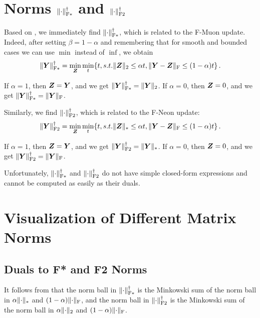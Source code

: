 \documentclass[pmlr]{jmlr}%
\DeclarePairedDelimiter{\normf}{\|}{\|_\mathrm{F}}
\DeclarePairedDelimiter{\norms}{\|}{\|_{\mathrm{2}}}
\DeclarePairedDelimiter{\normn}{\|}{\|_{*}}
\DeclarePairedDelimiter{\normfstar}{\|}{\|_\mathrm{F*}}
\DeclarePairedDelimiter{\normftwo}{\|}{\|_\mathrm{F2}}
\begin{document}
 \section[Norms for F-Muon and F-Neon]%
         {Norms $\normfstar{\cdot}^\dagger$ and $\normftwo{\cdot}^\dagger$}
 \label{sec:f2_fstar_norms}
 
 Based on , we immediately find $\normfstar{\cdot}^\dagger$, which is related to the F-Muon update. Indeed, after setting $\beta=1-\alpha$ and remembering that for smooth and bounded cases we can use $\min$ instead of $\inf$, we obtain
 \begin{equation}\label{eq:normfstardual}
   \normfstar{\mY}^\dagger = \min_{\mZ} \min_t\{t, s.t. \norms{\mZ}\leq \alpha t, \normf{\mY-\mZ}\leq (1-\alpha) t\}\,.
 \end{equation}
 
 If $\alpha = 1$, then ${\bm{Z}} = {\bm{Y}}$, and we get $\normfstar{\mY}^\dagger = \norms{\mY}$. If $\alpha = 0$, then ${\bm{Z}} = 0$, and we get $\normfstar{\mY}^\dagger = \normf{\mY}$.
 
 Similarly, we find $\normftwo{\cdot}^\dagger$, which is related to the F-Neon update:
 \begin{equation}\label{eq:normftwodual}
   \normftwo{\mY}^\dagger = \min_{\mZ} \min_t\{t, s.t. \normn{\mZ}\leq \alpha t, \normf{\mY-\mZ}\leq (1-\alpha) t\}\,.
 \end{equation}
 
 If $\alpha = 1$, then ${\bm{Z}} = {\bm{Y}}$, and we get $\normftwo{\mY}^\dagger = \normn{\mY}$. If $\alpha = 0$, then ${\bm{Z}} = 0$, and we get $\normftwo{\mY}^\dagger = \normf{\mY}$.
 
 Unfortunately, $\normfstar{\cdot}^\dagger$ and $\normftwo{\cdot}^\dagger$ do not have simple closed-form expressions and cannot be computed as easily as their duals.
 
 \section{Visualization of Different Matrix Norms}
 \subsection{Duals to F* and F2 Norms}
 
 It follows from  that the norm ball in $\normfstar{\cdot}^\dagger$ is the Minkowski sum of the norm ball in $\alpha\normn{\cdot}$ and $(1-\alpha)\normf{\cdot}$, and the norm ball in $\normftwo{\cdot}^\dagger$ is the Minkowski sum of the norm ball in $\alpha\norms{\cdot}$ and $(1-\alpha)\normf{\cdot}$.
 
\end{document}
